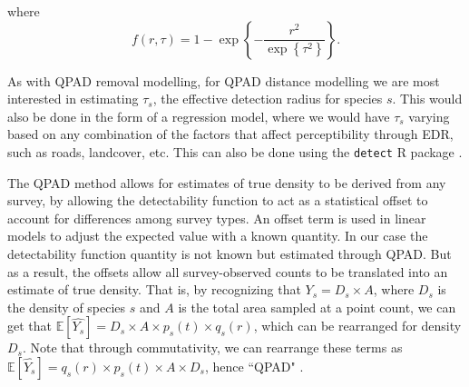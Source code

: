where 
$$f(r,\tau) =  1 - \exp\left\{ -\dfrac{r^2}{\exp\left\{\tau^2\right\}} \right\}.$$

\par As with QPAD removal modelling, for QPAD distance modelling we are most interested in estimating $\tau_s$, the effective detection radius for species $s$. 
This would also be done in the form of a regression model, where we would have $\tau_s$ varying based on any combination of the factors that affect perceptibility through EDR, such as roads, landcover, etc.
This can also be done using the \texttt{detect} R package \citep{solymos_detect_2020}.

\par The QPAD method allows for estimates of true density to be derived from any survey, by allowing the detectability function to act as a statistical offset to account for differences among survey types. An offset term is used in linear models to adjust the expected value with a known quantity. In our case the detectability function quantity is not known but estimated through QPAD. But as a result, the offsets allow all survey-observed counts to be translated into an estimate of true density. That is, by recognizing that $Y_s = D_s \times A$, where $D_s$ is the density of species $s$ and $A$ is the total area sampled at a point count, we can get that $\mathbb{E}\left[\hat{Y_s}\right] = D_s \times A \times p_s(t) \times q_s(r)$, which can be rearranged for density $D_s$. Note that through commutativity, we can rearrange these terms as $\mathbb{E}\left[\hat{Y_s}\right] = q_s(r) \times p_s(t) \times A \times D_s$, hence ``QPAD" \citep{solymos_calibrating_2013}.


